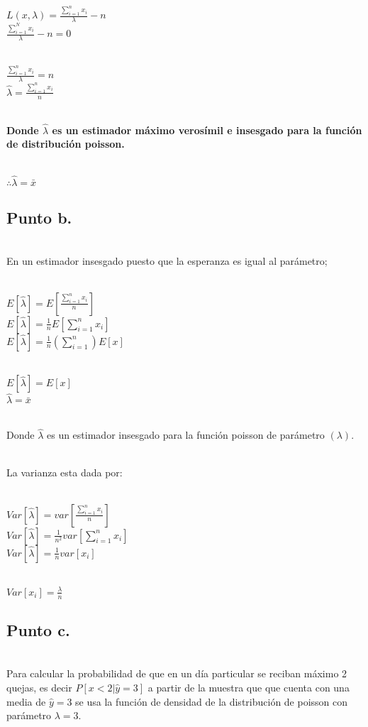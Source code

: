 \documentclass[letterpaper,12pt,onecolumn,titlepage]{article}
\begin{document}
~\\ $L(x,\lambda) = \frac{\sum_{i=1}^n{x_{i}}}{\lambda} - n $
~\\ $\frac{\sum_{i=1}^N{x_{i}}}{\lambda} - n = 0$

~\\ $\frac{\sum_{i=1}^n{x_{i}}}{\lambda} = n $
~\\ $\hat{\lambda} = \frac{\sum_{i=1}^n{x_{i}}}{n}$

~\\ \textbf{Donde $\hat{\lambda}$ es un estimador m\'{a}ximo veros\'{i}mil e insesgado para la funci\'{o}n de distribuci\'{o}n poisson.} 
 
~\\ $\therefore \hat{\lambda} = \bar{x}$

\subsection{Punto b.}
~\\ En un estimador insesgado puesto que la esperanza es igual al par\'{a}metro;

~\\ $E[\hat{\lambda}] = E[\frac{\sum_{i=1}^n{x_{i}}}{n}]$
~\\ $E[\hat{\lambda}] = \frac{1}{n}E[\sum_{i=1}^n{x_{i}}]$
~\\ $E[\hat{\lambda}] = \frac{1}{n}(\sum_{i=1}^n)E[x]$

~\\ $E[\hat{\lambda}] = E[x]$
~\\ $\hat{\lambda} = \bar{x}$

~\\ Donde $\hat{\lambda}$ es un estimador insesgado para la funci\'{o}n poisson de par\'{a}metro $(\lambda)$. 

~\\ La varianza esta dada por: 

~\\ $Var[\hat{\lambda}]= var[\frac{\sum_{i=1}^n{x_{i}}}{n}]$
~\\ $Var[\hat{\lambda}]= \frac{1}{n^2} var[\sum_{i=1}^n{x_{i}}]$
~\\ $Var[\hat{\lambda}]= \frac{1}{n} var[x_{i}]$

~\\ $Var[x_{i}]= \frac{\lambda}{n}$

\subsection{Punto c.}
~\\ Para calcular la probabilidad de que en un d\'{i}a particular se reciban m\'{a}ximo 2 quejas, es decir $P[x<2|\hat{y}=3]$ a partir de la muestra que que cuenta con una media de $\hat{y}=3$ se usa la funci\'{o}n de densidad de la distribuci\'{o}n de poisson con par\'{a}metro $\lambda=3$. 
\end{document}
